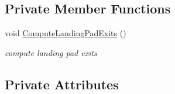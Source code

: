 \subsection*{Private Member Functions}
\begin{DoxyCompactItemize}
\item 
void \hyperlink{classLoop_a32029bfa844485ff802cb03e18052142}{Compute\+Landing\+Pad\+Exits} ()
\begin{DoxyCompactList}\small\item\em compute landing pad exits \end{DoxyCompactList}\end{DoxyCompactItemize}
\subsection*{Private Attributes}
